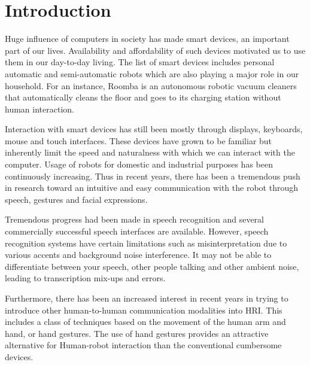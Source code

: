 \chapter{Introduction}
Huge influence of computers in society has made smart devices, an important part of our lives. Availability and affordability of such devices motivated us to use them in our day-to-day living. The list of smart devices includes personal automatic and semi-automatic robots which are also playing a major role in our household. For an instance, Roomba \cite{8} is an autonomous robotic vacuum cleaners that automatically cleans the floor and goes to its charging station without human interaction.

Interaction with smart devices has still been mostly through displays, keyboards, mouse and touch interfaces. These devices have grown to be familiar but inherently limit the speed and naturalness with which we can interact with the computer.  Usage of robots for domestic and industrial purposes has been continuously increasing. Thus in recent years, there has been a tremendous push in research toward an intuitive and easy communication with the robot through speech, gestures and facial expressions.

Tremendous progress had been made in speech recognition and several commercially successful speech interfaces are available. However, speech recognition systems have certain limitations such as misinterpretation due to various accents and background noise interference. It may not be able to differentiate between your speech, other people talking and other ambient noise, leading to transcription mix-ups and errors.

Furthermore, there has been an increased interest in recent years in trying to introduce other human-to-human communication modalities into HRI. This includes a class of techniques based on the movement of the human arm and hand, or hand gestures. The use of hand gestures provides an attractive alternative for Human-robot interaction than the conventional cumbersome devices.

